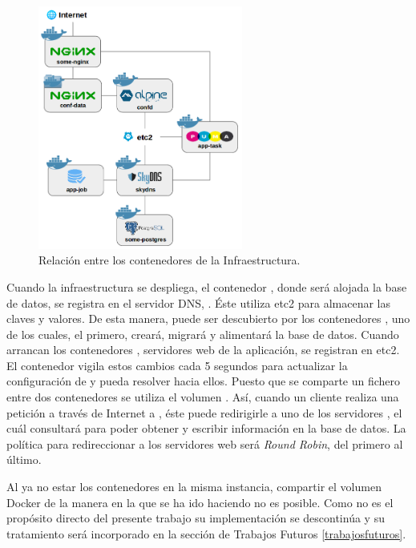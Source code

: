 \begin{figure}[H]
\centering
\includegraphics[width=0.6\textwidth]{images/figures/aws-2-iteration.png}
\caption{Relación entre los contenedores de la Infraestructura.}
\end{figure}

Cuando la infraestructura se despliega, el contenedor , donde será alojada la base de datos, se registra en el servidor DNS, . Éste utiliza etc2 para almacenar las claves y valores. De esta manera,  puede ser descubierto por los contenedores , uno de los cuales, el primero, creará, migrará y alimentará la base de datos. Cuando arrancan los contenedores , servidores web de la aplicación, se registran en etc2. El contenedor  vigila estos cambios cada 5 segundos para actualizar la configuración de  y pueda resolver hacia ellos. Puesto que se comparte un fichero entre dos contenedores se utiliza el volumen . Así, cuando un cliente realiza una petición a través de Internet a , éste puede redirigirle a uno de los servidores , el cuál consultará  para poder obtener y escribir información en la base de datos. La política para redireccionar a los servidores web será \textit{Round Robin}, del primero al último.

Al ya no estar los contenedores en la misma instancia, compartir el volumen Docker  de la manera en la que se ha ido haciendo no es posible. Como no es el propósito directo del presente trabajo su implementación se descontinúa y su tratamiento será incorporado en la sección de Trabajos Futuros \ref{trabajosfuturos}.

